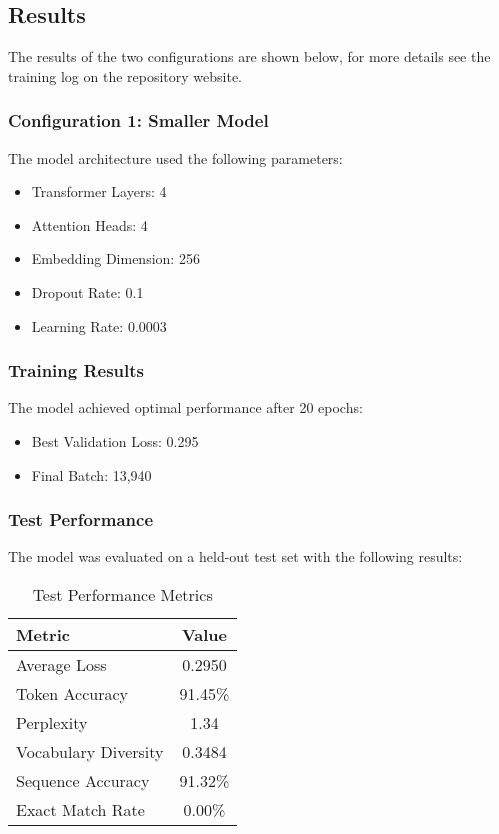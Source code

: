 \subsection{Results}

The results of the two configurations are shown below, for more details see the training log on the repository website.

\subsubsection*{Configuration 1: Smaller Model}

The model architecture used the following parameters:
\begin{itemize}
    \item Transformer Layers: 4
    \item Attention Heads: 4
    \item Embedding Dimension: 256
    \item Dropout Rate: 0.1
    \item Learning Rate: 0.0003
\end{itemize}

\subsubsection*{Training Results}
The model achieved optimal performance after 20 epochs:
\begin{itemize}
    \item Best Validation Loss: 0.295
    \item Final Batch: 13,940
\end{itemize}

\subsubsection*{Test Performance}
The model was evaluated on a held-out test set with the following results:

\begin{table}[h]
\centering
\caption{Test Performance Metrics}
\label{tab:metrics}
\begin{tabular}{lc}
\toprule
\textbf{Metric} & \textbf{Value} \\
\midrule
Average Loss & 0.2950 \\
Token Accuracy & 91.45\% \\
Perplexity & 1.34 \\
Vocabulary Diversity & 0.3484 \\
Sequence Accuracy & 91.32\% \\
Exact Match Rate & 0.00\% \\
\bottomrule
\end{tabular}
\end{table}

